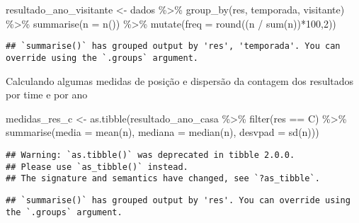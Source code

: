 \documentclass[
]{article}
\newenvironment{Shaded}{\begin{snugshade}}{\end{snugshade}}
\newcommand{\AttributeTok}[1]{\textcolor[rgb]{0.77,0.63,0.00}{#1}}
\newcommand{\DecValTok}[1]{\textcolor[rgb]{0.00,0.00,0.81}{#1}}
\newcommand{\FunctionTok}[1]{\textcolor[rgb]{0.00,0.00,0.00}{#1}}
\newcommand{\NormalTok}[1]{#1}
\newcommand{\OtherTok}[1]{\textcolor[rgb]{0.56,0.35,0.01}{#1}}
\newcommand{\SpecialCharTok}[1]{\textcolor[rgb]{0.00,0.00,0.00}{#1}}
\newcommand{\StringTok}[1]{\textcolor[rgb]{0.31,0.60,0.02}{#1}}
\begin{document}
\begin{Shaded}
\begin{Highlighting}[]
\NormalTok{resultado\_ano\_visitante }\OtherTok{\textless{}{-}}\NormalTok{ dados }\SpecialCharTok{\%\textgreater{}\%} \FunctionTok{group\_by}\NormalTok{(res, temporada, visitante) }\SpecialCharTok{\%\textgreater{}\%} 
  \FunctionTok{summarise}\NormalTok{(}\AttributeTok{n =} \FunctionTok{n}\NormalTok{()) }\SpecialCharTok{\%\textgreater{}\%} \FunctionTok{mutate}\NormalTok{(}\AttributeTok{freq =} \FunctionTok{round}\NormalTok{((n }\SpecialCharTok{/} \FunctionTok{sum}\NormalTok{(n))}\SpecialCharTok{*}\DecValTok{100}\NormalTok{,}\DecValTok{2}\NormalTok{))}
\end{Highlighting}
\end{Shaded}

\begin{verbatim}
## `summarise()` has grouped output by 'res', 'temporada'. You can override using the `.groups` argument.
\end{verbatim}

Calculando algumas medidas de posição e dispersão da contagem dos
resultados por time e por ano

\begin{Shaded}
\begin{Highlighting}[]
\NormalTok{medidas\_res\_c }\OtherTok{\textless{}{-}} \FunctionTok{as.tibble}\NormalTok{(resultado\_ano\_casa }\SpecialCharTok{\%\textgreater{}\%} \FunctionTok{filter}\NormalTok{(res }\SpecialCharTok{==} \StringTok{\textquotesingle{}C\textquotesingle{}}\NormalTok{) }\SpecialCharTok{\%\textgreater{}\%}
                             \FunctionTok{summarise}\NormalTok{(}\StringTok{\textquotesingle{}media\textquotesingle{}} \OtherTok{=} \FunctionTok{mean}\NormalTok{(n),}
                                      \StringTok{\textquotesingle{}mediana\textquotesingle{}} \OtherTok{=} \FunctionTok{median}\NormalTok{(n),}
                                      \StringTok{\textquotesingle{}desvpad\textquotesingle{}} \OtherTok{=} \FunctionTok{sd}\NormalTok{(n)))}
\end{Highlighting}
\end{Shaded}

\begin{verbatim}
## Warning: `as.tibble()` was deprecated in tibble 2.0.0.
## Please use `as_tibble()` instead.
## The signature and semantics have changed, see `?as_tibble`.
\end{verbatim}

\begin{verbatim}
## `summarise()` has grouped output by 'res'. You can override using the `.groups` argument.
\end{verbatim}
\end{document}
